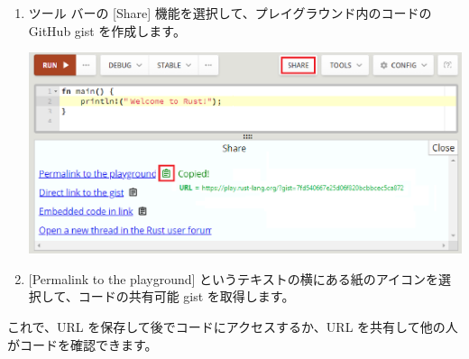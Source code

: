\begin{enumerate}
\item ツール バーの [Share] 機能を選択して、プレイグラウンド内のコードの GitHub gist を作成します。

\includegraphics[width=14cm]{rust-playground-share.eps}

\item $[$Permalink to the playground] というテキストの横にある紙のアイコンを選択して、コードの共有可能 gist を取得します。
\end{enumerate}

これで、URL を保存して後でコードにアクセスするか、URL を共有して他の人がコードを確認できます。




